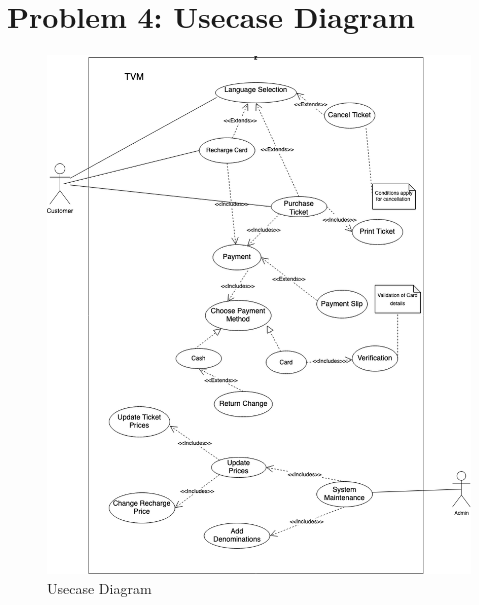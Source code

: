 \documentclass{article}
\begin{document}
{\section{Problem 4: Usecase Diagram}
\begin{figure}[!p]
    \begin{center}
        \includegraphics[width=5in]{UseCaseV2.drawio.png}
        \caption{Usecase Diagram}
    \end{center}
\end{figure}
}
\end{document}
